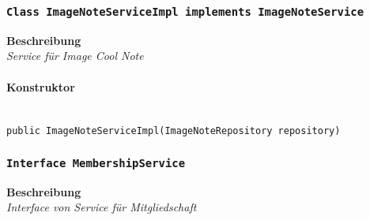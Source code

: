     \subsubsection{\texttt{Class ImageNoteServiceImpl implements ImageNoteService}}
    \textbf{Beschreibung} \\
    \textit{Service für Image Cool Note}
    \paragraph*{Konstruktor}\mbox{} \\
    \texttt{public ImageNoteServiceImpl(ImageNoteRepository repository)} \\
    \subsubsection{\texttt{Interface MembershipService}}
    \textbf{Beschreibung} \\
    \textit{Interface von Service für Mitgliedschaft}
